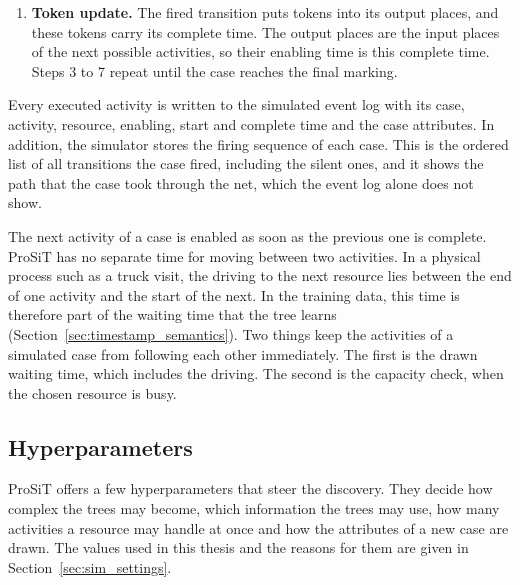 \begin{enumerate}[itemsep=2pt,topsep=4pt]
chosen resource. Its leaves hold time distributions, and its splits use the
activity, the hour, the weekday, the case attributes, the activities so far and,
if switched on, the workload features of the resource. The first activity of a
case gets no waiting time, because the arrival tree already sets its start. The
start of the activity is the enabling time, or the moment the busy resource
becomes free, plus the waiting time. The complete time is the start plus an
execution time drawn from the execution-time tree of the activity. Both times are
counted in open minutes of the resource calendar.
\item \textbf{Token update.} The fired transition puts tokens into its output
places, and these tokens carry its complete time. The output places are the input
places of the next possible activities, so their enabling time is this complete
time. Steps 3 to 7 repeat until the case reaches the final marking.
\end{enumerate}
Every executed activity is written to the simulated event log with its case,
activity, resource, enabling, start and complete time and the case attributes.
In addition, the simulator stores the firing sequence of each case. This is the
ordered list of all transitions the case fired, including the silent ones, and it
shows the path that the case took through the net, which the event log alone
does not show.

The next activity of a case is enabled as soon as the previous one is complete.
ProSiT has no separate time for moving between two activities. In a physical
process such as a truck visit, the driving to the next resource lies between the
end of one activity and the start of the next. In the training data, this time
is therefore part of the waiting time that the tree learns
(Section~\ref{sec:timestamp_semantics}). Two things keep the activities of a
simulated case from following each other immediately. The first is the drawn
waiting time, which includes the driving. The second is the capacity check, when
the chosen resource is busy.

\subsection{Hyperparameters}
\label{sec:prosit_hyperparameters}
ProSiT offers a few hyperparameters that steer the discovery. They decide how
complex the trees may become, which information the trees may use, how many
activities a resource may handle at once and how the attributes of a new case are
drawn. The values used in this thesis and the reasons for them are given in
Section~\ref{sec:sim_settings}.

